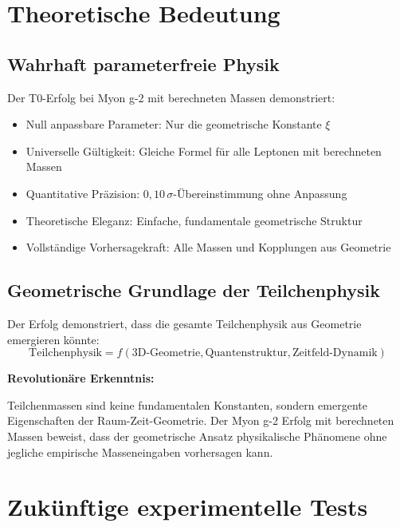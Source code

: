 \documentclass[12pt,a4paper]{article}
\numberwithin{equation}{section}
\begin{document}
	\section{Theoretische Bedeutung}
	
	\subsection{Wahrhaft parameterfreie Physik}
	
	Der T0-Erfolg bei Myon g-2 mit berechneten Massen demonstriert:
	\begin{itemize}
		\item Null anpassbare Parameter: Nur die geometrische Konstante $\xi$
		\item Universelle G\"ultigkeit: Gleiche Formel f\"ur alle Leptonen mit berechneten Massen
		\item Quantitative Pr\"azision: $0{,}10\,\sigma$-\"Ubereinstimmung ohne Anpassung
		\item Theoretische Eleganz: Einfache, fundamentale geometrische Struktur
		\item Vollst\"andige Vorhersagekraft: Alle Massen und Kopplungen aus Geometrie
	\end{itemize}
	
	\subsection{Geometrische Grundlage der Teilchenphysik}
	
	Der Erfolg demonstriert, dass die gesamte Teilchenphysik aus Geometrie emergieren k\"onnte:
	\begin{equation}
		\text{Teilchenphysik} = f(\text{3D-Geometrie}, \text{Quantenstruktur}, \text{Zeitfeld-Dynamik})
	\end{equation}
	
	\begin{t0wichtig}
		\textbf{Revolution\"are Erkenntnis:}
		
		Teilchenmassen sind keine fundamentalen Konstanten, sondern emergente Eigenschaften der Raum-Zeit-Geometrie. Der Myon g-2 Erfolg mit berechneten Massen beweist, dass der geometrische Ansatz physikalische Ph\"anomene ohne jegliche empirische Masseneingaben vorhersagen kann.
	\end{t0wichtig}
	
	\section{Zuk\"unftige experimentelle Tests}
	
\end{document}
